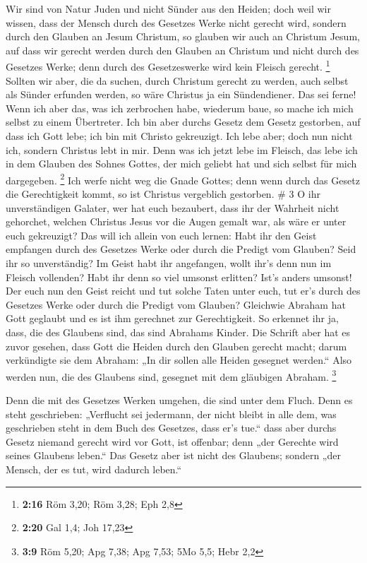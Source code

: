  Wir sind von Natur Juden und nicht Sünder aus den Heiden;
 doch weil wir wissen, dass der Mensch durch des Gesetzes
Werke nicht gerecht wird, sondern durch den Glauben an Jesum Christum,
so glauben wir auch an Christum Jesum, auf dass wir gerecht werden durch
den Glauben an Christum und nicht durch des Gesetzes Werke; denn durch
des Gesetzeswerke wird kein Fleisch gerecht. \footnote{\textbf{2:16} Röm
  3,20; Röm 3,28; Eph 2,8}  Sollten wir aber, die da
suchen, durch Christum gerecht zu werden, auch selbst als Sünder
erfunden werden, so wäre Christus ja ein Sündendiener. Das sei ferne!
 Wenn ich aber das, was ich zerbrochen habe, wiederum baue,
so mache ich mich selbst zu einem Übertreter.  Ich bin aber
durchs Gesetz dem Gesetz gestorben, auf dass ich Gott lebe; ich bin mit
Christo gekreuzigt.  Ich lebe aber; doch nun nicht ich,
sondern Christus lebt in mir. Denn was ich jetzt lebe im Fleisch, das
lebe ich in dem Glauben des Sohnes Gottes, der mich geliebt hat und sich
selbst für mich dargegeben. \footnote{\textbf{2:20} Gal 1,4; Joh 17,23}
 Ich werfe nicht weg die Gnade Gottes; denn wenn durch das
Gesetz die Gerechtigkeit kommt, so ist Christus vergeblich gestorben. \#
3  O ihr unverständigen Galater, wer hat euch bezaubert,
dass ihr der Wahrheit nicht gehorchet, welchen Christus Jesus vor die
Augen gemalt war, als wäre er unter euch gekreuzigt?  Das
will ich allein von euch lernen: Habt ihr den Geist empfangen durch des
Gesetzes Werke oder durch die Predigt vom Glauben?  Seid ihr
so unverständig? Im Geist habt ihr angefangen, wollt ihr's denn nun im
Fleisch vollenden?  Habt ihr denn so viel umsonst erlitten?
Ist's anders umsonst!  Der euch nun den Geist reicht und tut
solche Taten unter euch, tut er's durch des Gesetzes Werke oder durch
die Predigt vom Glauben?  Gleichwie Abraham hat Gott
geglaubt und es ist ihm gerechnet zur Gerechtigkeit.  So
erkennet ihr ja, dass, die des Glaubens sind, das sind Abrahams Kinder.
 Die Schrift aber hat es zuvor gesehen, dass Gott die Heiden
durch den Glauben gerecht macht; darum verkündigte sie dem Abraham: „In
dir sollen alle Heiden gesegnet werden.``  Also werden nun,
die des Glaubens sind, gesegnet mit dem gläubigen Abraham. \footnote{\textbf{3:9}
  Röm 5,20; Apg 7,38; Apg 7,53; 5Mo 5,5; Hebr 2,2}

 Denn die mit des Gesetzes Werken umgehen, die sind unter
dem Fluch. Denn es steht geschrieben: „Verflucht sei jedermann, der
nicht bleibt in alle dem, was geschrieben steht in dem Buch des
Gesetzes, dass er's tue.``  dass aber durchs Gesetz niemand
gerecht wird vor Gott, ist offenbar; denn „der Gerechte wird seines
Glaubens leben.``  Das Gesetz aber ist nicht des Glaubens;
sondern „der Mensch, der es tut, wird dadurch leben.``

